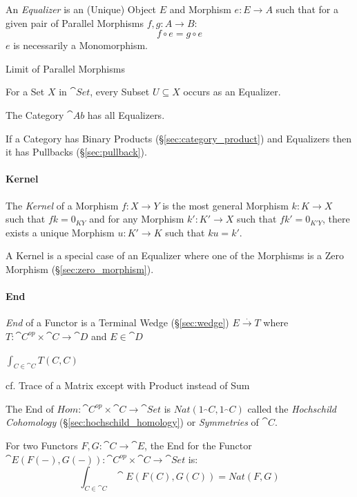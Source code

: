 An \emph{Equalizer} is an (Unique) Object $E$ and Morphism $e: E
\rightarrow A$ such that for a given pair of Parallel Morphisms $f,g :
A \rightarrow B$:
\[
  f \circ e = g \circ e
\]
$e$ is necessarily a Monomorphism.

Limit of Parallel Morphisms

For a Set $X$ in $\cat{Set}$, every Subset $U \subseteq X$ occurs
as an Equalizer.

The Category $\cat{Ab}$ has all Equalizers.

If a Category has Binary Products (\S\ref{sec:category_product}) and
Equalizers then it has Pullbacks (\S\ref{sec:pullback}).



\paragraph{Kernel}\label{sec:morphism_kernel}\hfill

The \emph{Kernel} of a Morphism $f : X \rightarrow Y$ is the most
general Morphism $k : K \rightarrow X$ such that $fk = 0_{KY}$ and for
any Morphism $k' : K' \rightarrow X$ such that $fk' = 0_{K'Y}$, there
exists a unique Morphism $u : K' \rightarrow K$ such that $ku = k'$.

A Kernel is a special case of an Equalizer where one of the Morphisms
is a Zero Morphism (\S\ref{sec:zero_morphism}).



\paragraph{End}\label{sec:end}\hfill

\emph{End} of a Functor is a Terminal Wedge (\S\ref{sec:wedge}) $E
\xrightarrow{.} T$ where $T : \cat{C}^{op} \times \cat{C} \rightarrow \cat{D}$
and $E \in \cat{D}$

$\int_{C \in \cat{C}} T(C,C)$

cf. Trace of a Matrix except with Product instead of Sum

The End of $Hom : \cat{C}^{op} \times \cat{C} \rightarrow \cat{Set}$ is
$Nat (1_\cat{C},1_\cat{C})$ called the \emph{Hochschild Cohomology}
(\S\ref{sec:hochschild_homology}) or \emph{Symmetries} of $\cat{C}$.

For two Functors $F,G : \cat{C} \rightarrow \cat{E}$, the End for the Functor
$\cat{E}(F(-), G(-)) : \cat{C}^{op} \times \cat{C} \rightarrow \cat{Set}$ is:
\[
  \int_{C \in \cat{C}} \cat{E}(F(C), G(C)) = Nat (F,G)
\]

